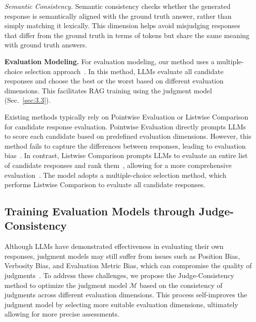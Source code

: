 \textit{Semantic Consistency.} Semantic consistency checks whether the generated response is semantically aligned with the ground truth answer, rather than simply matching it lexically. This dimension helps avoid misjudging responses that differ from the ground truth in terms of tokens but share the same meaning with ground truth answers.

\textbf{Evaluation Modeling.} For evaluation modeling, our \method{} method uses a multiple-choice selection approach~\cite{SurveyonLLM-as-a-Judge2024Gu}. In this method, LLMs evaluate all candidate responses and choose the best or the worst based on different evaluation dimensions. This facilitates RAG training using the judgment model (Sec.~\ref{sec:3.3}).

Existing methods typically rely on Pointwise Evaluation or Listwise Comparison for candidate response evaluation. Pointwise Evaluation directly prompts LLMs to score each candidate based on predefined evaluation dimensions.
However, this method fails to capture the differences between responses, leading to evaluation bias~\cite{kim2023prometheus,wang2023learning}. 
In contrast, Listwise Comparison prompts LLMs to evaluate an entire list of candidate responses and rank them~\cite{niu2024judgerank,yan2024consolidating}, allowing for a more comprehensive evaluation~\cite{li2024llms}. The \method{} model adopts a multiple-choice selection method, which performs Listwise Comparison to evaluate all candidate responses.






\subsection{Training Evaluation Models through Judge-Consistency} \label{sec:3.2}
Although LLMs have demonstrated effectiveness in evaluating their own responses, judgment models may still suffer from issues such as Position Bias, Verbosity Bias, and Evaluation Metric Bias, which can compromise the quality of judgments~\cite{zheng2023judging,chen2024humans,li2024llms}. To address these challenges, we propose the Judge-Consistency method to optimize the judgment model $\mathcal{M}$ based on the consistency of judgments across different evaluation dimensions. This process self-improves the judgment model by selecting more suitable evaluation dimensions, ultimately allowing for more precise assessments.


